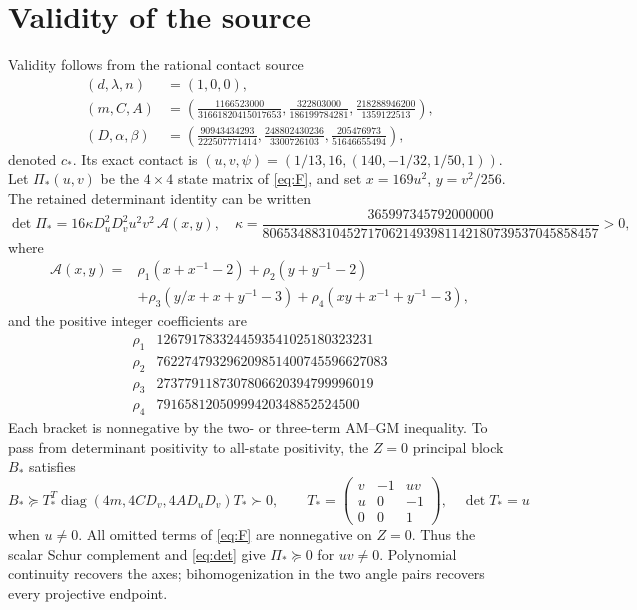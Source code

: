\documentclass[10pt]{article}
\newcommand{\diag}{\operatorname{diag}}
\begin{document}
\section{Validity of the source}
Validity follows from the rational contact source
\begin{equation}
\begin{aligned}
(d,\lambda,n)&=(1,0,0),\\
(m,C,A)&=\left(\frac{1166523000}{31661820415017653},
\frac{322803000}{186199784281},\frac{218288946200}{1359122513}\right),\\
(D,\alpha,\beta)&=\left(\frac{90943434293}{222507771414},
\frac{248802430236}{3300726103},\frac{205476973}{51646655494}\right),
\end{aligned}                                               \label{eq:cstar}
\end{equation}
denoted $c_*$. Its exact contact is
$(u,v,\psi)=(1/13,16,(140,-1/32,1/50,1))$.
Let $\Pi_*(u,v)$ be the
$4\times4$ state matrix of \eqref{eq:F}, and set
$x=169u^2$, $y=v^2/256$. The retained determinant identity can be written
\begin{equation}
\det\Pi_*=16\kappa D_u^2D_v^2u^2v^2\,\mathcal A(x,y),
\quad
\kappa=\frac{365997345792000000}
 {806534883104527170621493981142180739537045858457}>0,        \label{eq:det}
\end{equation}
where
\begin{align*}
\mathcal A(x,y)={}&\rho_1(x+x^{-1}-2)+\rho_2(y+y^{-1}-2)\\
&+\rho_3(y/x+x+y^{-1}-3)+\rho_4(xy+x^{-1}+y^{-1}-3),
\end{align*}
and the positive integer coefficients are
\[
\begin{array}{c|r}
\rho_1&1267917833244593541025180323231\\
\rho_2&762274793296209851400745596627083\\
\rho_3&2737791187307806620394799996019\\
\rho_4&79165812050999420348852524500
\end{array}
\]
Each bracket is nonnegative by the two- or three-term AM--GM inequality.
To pass from determinant positivity to all-state positivity, the $Z=0$
principal block $B_*$ satisfies
\begin{equation}
B_*\succeq T_*^T\diag(4m,4CD_v,4AD_uD_v)T_*\succ0,
\qquad
T_* =\begin{pmatrix}v&-1&uv\\u&0&-1\\0&0&1\end{pmatrix},
\quad\det T_*=u                                           \label{eq:transverse}
\end{equation}
when $u\ne0$. All omitted terms of \eqref{eq:F} are nonnegative on $Z=0$.
Thus the scalar Schur complement and \eqref{eq:det} give
$\Pi_*\succeq0$ for $uv\ne0$. Polynomial continuity recovers the axes;
bihomogenization in the two angle pairs recovers every projective endpoint.
\end{document}
